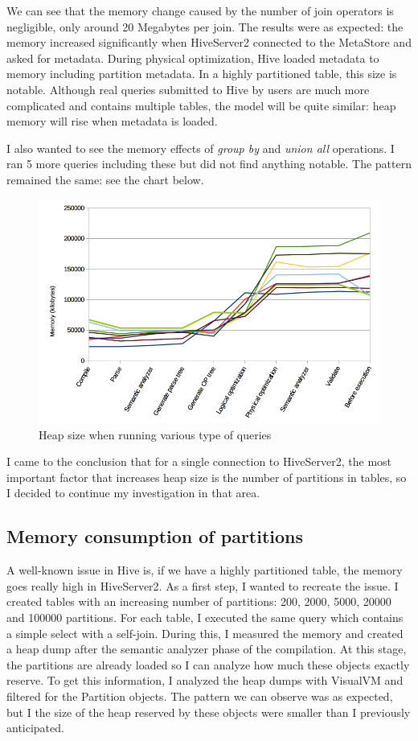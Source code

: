 We can see that the memory change caused by the number of join operators is negligible, only around 20 Megabytes per join. The results were as expected: the memory increased significantly when HiveServer2 connected to the MetaStore and asked for metadata. During physical optimization, Hive loaded metadata to memory including partition metadata. In a highly partitioned table, this size is notable. Although real queries submitted to Hive by users are much more complicated and contains multiple tables, the model will be quite similar: heap memory will rise when metadata is loaded.

I also wanted to see the memory effects of \textit{group by} and  \textit{union all} operations. I ran 5 more queries including these but did not find anything notable. The pattern remained the same: see the chart below. 

\begin{figure}[H]
	\includegraphics[width=150mm, keepaspectratio]{figures/hs2_memory.png}
	\centering
	\caption{Heap size when running various type of queries}
\end{figure}

I came to the conclusion that for a single connection to HiveServer2, the most important factor that increases heap size is the number of partitions in tables, so I decided to continue my investigation in that area. 

\subsection{Memory consumption of partitions}
A well-known issue in Hive is, if we have a highly partitioned table, the memory goes really high in HiveServer2. As a first step, I wanted to recreate the issue. I created tables with an increasing number of partitions: 200, 2000, 5000, 20000 and 100000 partitions. For each table, I executed the same query which contains a simple select with a self-join. During this, I measured the memory and created a heap dump after the semantic analyzer phase of the compilation. At this stage, the partitions are already loaded so I can analyze how much these objects exactly reserve. To get this information, I analyzed the heap dumps with VisualVM and filtered for the Partition objects. The pattern we can observe was as expected, but I the size of the heap reserved by these objects were smaller than I previously anticipated.

